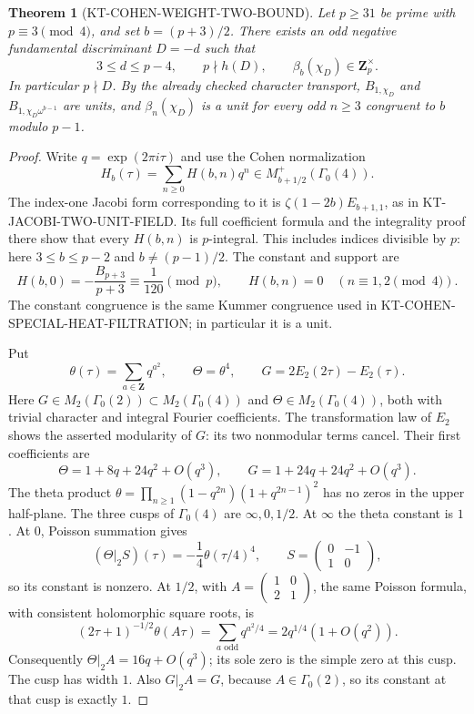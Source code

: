 \documentclass[11pt,a4paper]{article}
\newtheorem{theorem}{Theorem}[section]
\theoremstyle{definition}
\begin{document}
\begin{theorem}[KT-COHEN-WEIGHT-TWO-BOUND]
Let $p\geq31$ be prime with $p\equiv3\pmod4$, and set
$b=(p+3)/2$.  There exists an odd negative fundamental discriminant
$D=-d$ such that
\[
 3\leq d\leq p-4,\qquad
 p\nmid h(D),\qquad \beta_b(\chi_D)\in\mathbf Z_p^\times.
 \tag{CW.1}
\]
In particular $p\nmid D$.  By the already checked character transport,
$B_{1,\chi_D}$ and $B_{1,\chi_D\omega^{b-1}}$ are units, and
$\beta_n(\chi_D)$ is a unit for every odd $n\geq3$ congruent to $b$
modulo $p-1$.
\end{theorem}

\begin{proof}
Write $q=\exp(2\pi i\tau)$ and use the Cohen normalization
\[
 H_b(\tau)=\sum_{n\geq0}H(b,n)q^n
       \in M_{b+1/2}^{+}(\Gamma_0(4)).
 \tag{CW.2}
\]
The index-one Jacobi form corresponding to it is
$\zeta(1-2b)E_{b+1,1}$, as in KT-JACOBI-TWO-UNIT-FIELD.
Its full coefficient formula and the integrality proof there show
that every $H(b,n)$ is $p$-integral.  This includes indices divisible
by $p$: here $3\leq b\leq p-2$ and $b\ne(p-1)/2$.
The constant and support are
\[
 H(b,0)=-\frac{B_{p+3}}{p+3}\equiv\frac1{120}\pmod p,
 \qquad H(b,n)=0\quad(n\equiv1,2\pmod4).
 \tag{CW.3}
\]
The constant congruence is the same Kummer congruence used in
KT-COHEN-SPECIAL-HEAT-FILTRATION; in particular it is a unit.

Put
\[
 \theta(\tau)=\sum_{a\in\mathbf Z}q^{a^2},\qquad
 \Theta=\theta^4,
 \qquad G=2E_2(2\tau)-E_2(\tau).
 \tag{CW.4}
\]
Here $G\in M_2(\Gamma_0(2))\subset M_2(\Gamma_0(4))$ and
$\Theta\in M_2(\Gamma_0(4))$, both with trivial character and
integral Fourier coefficients.  The transformation law of $E_2$
shows the asserted modularity of $G$: its two nonmodular terms
cancel.  Their first coefficients are
\[
 \Theta=1+8q+24q^2+O(q^3),\qquad
 G=1+24q+24q^2+O(q^3).
 \tag{CW.5}
\]
The theta product
$\theta=\prod_{n\geq1}(1-q^{2n})(1+q^{2n-1})^2$
has no zeros in the upper half-plane.  The three cusps of
$\Gamma_0(4)$ are $\infty,0,1/2$.  At $\infty$ the theta
constant is $1$.  At $0$, Poisson summation gives
\[
 (\Theta|_2S)(\tau)=-\frac14\theta(\tau/4)^4,
 \qquad S=\begin{pmatrix}0&-1\\1&0\end{pmatrix},
 \tag{CW.6}
\]
so its constant is nonzero.  At $1/2$, with
$A=\left(\begin{smallmatrix}1&0\\2&1\end{smallmatrix}\right)$,
the same Poisson formula, with consistent holomorphic square roots,
is
\[
 (2\tau+1)^{-1/2}\theta(A\tau)
      =\sum_{a\text{ odd}}q^{a^2/4}
      =2q^{1/4}(1+O(q^2)).
 \tag{CW.7}
\]
Consequently $\Theta|_2A=16q+O(q^3)$; its sole zero is
the simple zero at this cusp.  The cusp has width $1$.
Also $G|_2A=G$, because $A\in\Gamma_0(2)$, so its constant
at that cusp is exactly $1$.


\end{proof}
\end{document}
